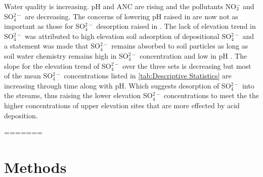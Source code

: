 Water quality is increasing.  
pH and ANC are rising and the pollutants NO$_3^-$ and SO$_4^{2-}$ are decreasing.  
The concerns of lowering pH raised in \citet{robinson2008ph} are now not as important as those for SO$_4^{2-}$ desorption raised in \citet{cai2013}.  
The lack of elevation trend in SO$_4^{2-}$ was attributed to high elevation soil adsorption of depositional SO$_4^{2-}$ and a statement was made that SO$_4^{2-}$ remains absorbed to soil particles as long as soil water chemistry remains high in SO$_4^{2-}$ concentration and low in pH \citep{cai2011long}.  
The slope for the elevation trend of SO$_4^{2-}$ over the three sets is decreasing but most of the mean SO$_4^{2-}$ concentrations listed in \autoref{tab:Descriptive Statistics} are increasing through time along with pH.
Which suggests desorption of SO$_4^{2-}$ into the streams, thus raising the lower elevation SO$_4^{2-}$ concentrations to meet the the higher concentrations of upper elevation sites that are more effected by acid deposition.


  
=======
\section{Methods}

